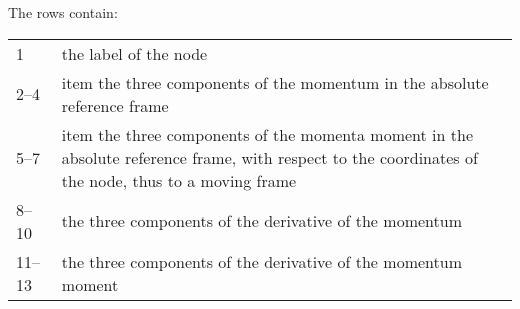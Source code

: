 The rows contain: \vspace{2mm} \\
\begin{tabular}{lp{140mm}}
        \hline
	1	& the label of the node \\
	2--4	& item the three components of the momentum
		in the absolute reference frame \\
	5--7	& item the three components of the momenta moment
		in the absolute reference frame,
		with respect to the coordinates of the node, 
		thus to a moving frame \\
    	8--10	& the three components of the derivative of the momentum \\
    	11--13	& the three components of the derivative of the momentum moment \\
	\hline
\end{tabular}\vspace{2mm}\\


